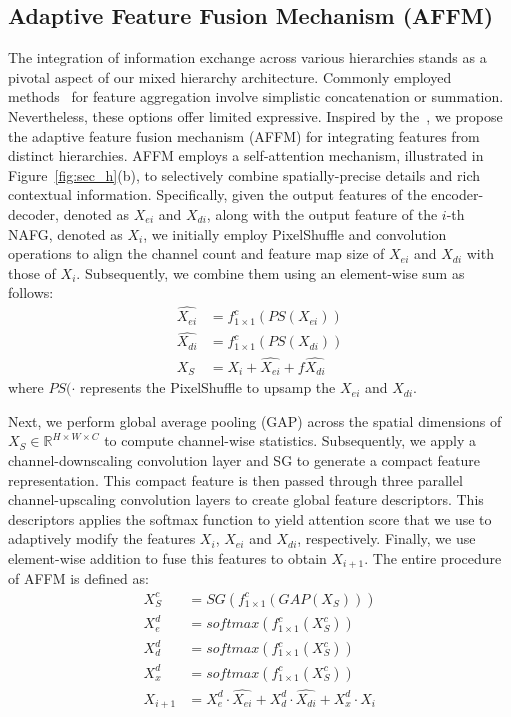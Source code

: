 \documentclass[lettersize,journal]{IEEEtran}
\begin{document}
\subsection{Adaptive Feature Fusion Mechanism (AFFM)}
The integration of information exchange across various hierarchies stands as a pivotal aspect of our mixed hierarchy architecture. Commonly employed methods~\cite{Zamir2021MPRNet,PREnet,RESCAN} for feature aggregation involve simplistic concatenation or summation. Nevertheless, these options offer limited expressive. Inspired by the~\cite{Zamir2022MIRNetv2,li2019selective}, we propose the adaptive feature fusion mechanism (AFFM) for integrating features from distinct hierarchies. AFFM employs a self-attention mechanism, illustrated in Figure~\ref{fig:sec_h}(b), to selectively combine spatially-precise details and rich contextual information. 
Specifically, given the output features of the encoder-decoder, denoted as $X_{ei}$ and $X_{di}$, along with the output feature of the $i$-th NAFG, denoted as $X_i$, we initially employ PixelShuffle and convolution operations to align the channel count and feature map size of $X_{ei}$ and $X_{di}$ with those of $X_i$. Subsequently, we combine them using an element-wise sum as follows:
\begin{equation}
\begin{aligned}
	\label{equ:s1sum}
 \hat{X_{ei}} &= f_{1 \times 1}^c(PS(X_{ei}))
 \\
 \hat{X_{di}} &= f_{1 \times 1}^c(PS(X_{di}))
 \\
    X_S &= X_i + \hat{X_{ei}} +  f\hat{X_{di}}
\end{aligned}
\end{equation}
where $PS(\cdot$ represents the PixelShuffle to upsamp the $X_{ei}$ and $X_{di}$.

Next, we perform global average pooling (GAP) across the spatial dimensions of $X_S \in \mathbb{R}^{H \times W \times C}$ to compute channel-wise statistics. Subsequently, we apply a channel-downscaling convolution layer and  SG to generate a compact feature representation. This compact feature is then passed through three parallel channel-upscaling convolution layers to create global feature descriptors. This descriptors applies the softmax
function to  yield attention score that we use to adaptively modify the features $X_i$, $X_{ei}$ and $X_{di}$, respectively. Finally, we use element-wise addition to fuse this features to obtain $X_{i+1}$. The entire  procedure of AFFM is  defined as:
\begin{equation}
\begin{aligned}
\label{equ:select}
    X^{c}_S &= SG(f_{1 \times 1}^c(GAP(X_S)))
    \\
    X^{d}_e &= softmax(f_{1 \times 1}^c(X^{c}_S))
    \\
    X^{d}_d &= softmax(f_{1 \times 1}^c(X^{c}_S))
      \\
    X^{d}_x &= softmax(f_{1 \times 1}^c(X^{c}_S))
      \\
    X_{i+1} &= X^{d}_e \cdot \hat{X_{ei}} + X^{d}_d \cdot \hat{X_{di}} +  X^{d}_x\cdot X_i
\end{aligned}
\end{equation}
\end{document}
